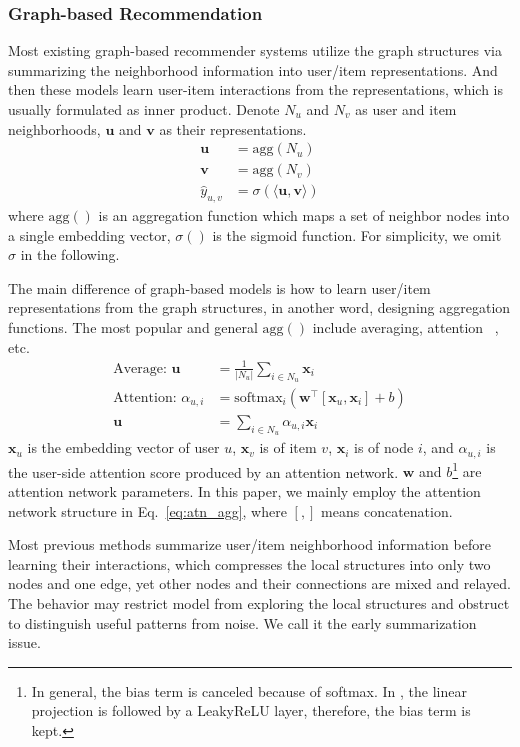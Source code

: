 \documentclass[sigconf]{acmart}
\newcommand{\bu}{\mathbf{u}}
\newcommand{\bv}{\mathbf{v}}
\newcommand{\bw}{\mathbf{w}}
\newcommand{\bx}{\mathbf{x}}
\newcommand{\new}[1]{{\color{black} #1}}
\begin{document}
\subsubsection{Graph-based Recommendation} \new{Most existing graph-based recommender systems utilize the graph structures via summarizing the neighborhood information into user/item representations. And then these models learn user-item interactions from the representations, which is usually formulated as inner product.} Denote $N_u$ and $N_v$ as user and item neighborhoods, $\bu$ and $\bv$ as their representations.
\begin{align}
\bu & = \text{agg}(N_u) \\
\bv & = \text{agg}(N_v) \\
\hat{y}_{u,v} & = \sigma(\langle \bu, \bv \rangle)
\end{align}
where $\text{agg}()$ is an aggregation function which maps a set of neighbor nodes into a single embedding vector, $\sigma()$ is the sigmoid function. For simplicity, we omit $\sigma$ in the following.

\new{The main difference of graph-based models is how to learn user/item representations from the graph structures, in another word, designing aggregation functions. The most popular and general $\text{agg}()$ include averaging, attention ~\cite{wang2018dkn,zhang2016collaborative,wang2018ripplenet}, etc.}
\begin{align}
\text{Average: } \bu & = \frac{1}{|N_u|} \sum_{i \in N_u} \bx_i \label{eq:avg_form} \\
\text{Attention: } \alpha_{u,i} & = \text{softmax}_i(\bw^\top [\bx_u, \bx_i] + b) \label{eq:atn_agg} \\
\bu & = \sum_{i \in N_u} \alpha_{u,i} \bx_i \label{eq:atn_form}
\end{align}
$\bx_u$ is the embedding vector of user $u$, $\bx_v$ is of item $v$, $\bx_i$ is of node $i$, and $\alpha_{u,i}$ is the user-side attention score produced by an attention network. \new{$\bw$ and $b$\footnote{In general, the bias term is canceled because of softmax. In \cite{velickovic2017graph}, the linear projection is followed by a LeakyReLU layer, therefore, the bias term is kept.} are attention network parameters. 
In this paper, we mainly employ the attention network structure in Eq.~\eqref{eq:atn_agg}, where $[,]$ means concatenation.}

\new{Most previous methods summarize user/item neighborhood information before learning their interactions, which compresses the local structures into only two nodes and one edge, yet other nodes and their connections are mixed and relayed. The behavior may restrict model from exploring the local structures and obstruct to distinguish useful patterns from noise. We call it the early summarization issue.}
\end{document}
